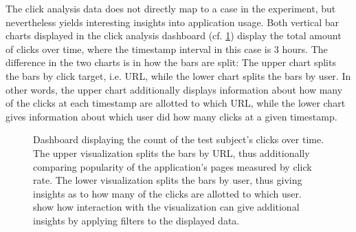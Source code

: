 The click analysis data does not directly map to a case in the experiment, but nevertheless yields interesting insights into application usage.
Both vertical bar charts displayed in the click analysis dashboard (cf. \cref{figure:evaluation:user:dashboard-clicks}) display the total amount of clicks over time, where the timestamp interval in this case is 3 hours.
The difference in the two charts is in how the bars are split:
The upper chart splits the bars by click target, i.e. URL, while the lower chart splits the bars by user.
In other words, the upper chart additionally displays information about how many of the clicks at each timestamp are allotted to which URL, while the lower chart gives information about which user did how many clicks at a given timestamp.

\begin{figure}[t]
        \caption[Dashboard displaying the count of the test subject's clicks over time.]{
        Dashboard displaying the count of the test subject's clicks over time.
        The upper visualization splits the bars by URL, thus additionally comparing popularity of the application's pages measured by click rate.
        The lower visualization splits the bars by user, thus giving insights as to how many of the clicks are allotted to which user.
         show how interaction with the visualization can give additional insights by applying filters to the displayed data.
        }
        \label{figure:evaluation:user:dashboard-clicks}
\end{figure}

